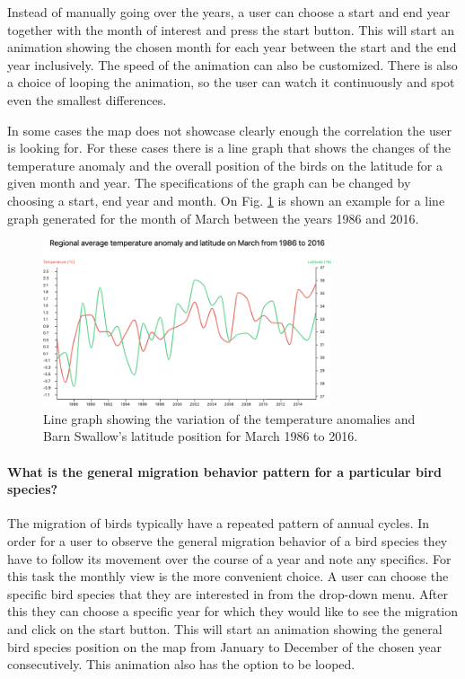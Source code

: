 \documentclass[journal]{vgtc}                %
\begin{document}
Instead of manually going over the years, a user can choose a start and end year together with the month of interest and press the start button. This will start an animation showing the chosen month for each year between the start and the end year inclusively. The speed of the animation can also be customized. There is also a choice of looping the animation, so the user can watch it continuously and spot even the smallest differences.

In some cases the map does not showcase clearly enough the correlation the user is looking for. For these cases there is a line graph that shows the changes of the temperature anomaly and the overall position of the birds on the latitude for a given month and year. The specifications of the graph can be changed by choosing a start, end year and month. On Fig. \ref{fig:march86-16-graph} is shown an example for a line graph generated for the month of March between the years 1986 and 2016.

\begin{figure}[h]
  \centering
  \includegraphics[width=85mm]{march86-16-graph-barnswallow}
  \caption{Line graph showing the variation of the temperature anomalies and Barn Swallow's latitude position for March 1986 to 2016.}
  \label{fig:march86-16-graph}
\end{figure}

\paragraph{What is the general migration behavior pattern for a particular bird species?}

The migration of birds typically have a repeated pattern of annual cycles. In order for a user to observe the general migration behavior of a bird species they have to follow its movement over the course of a year and note any specifics. For this task the monthly view is the more convenient choice.  A user can choose the specific bird species that they are interested in from the drop-down menu. After this they can choose a specific year for which they would like to see the migration and click on the start button. This will start an animation showing the general bird species position on the map from January to December of the chosen year consecutively. This animation also has the option to be looped.
\end{document}
